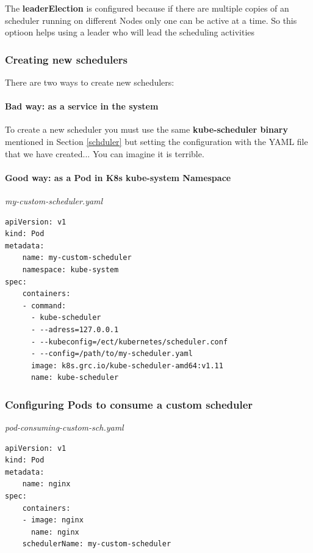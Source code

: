 \documentclass{article}
\newenvironment{codetemplate}[1][]{%
  \mybasecolorbox[#1]
  \itshape
}{%
  \endmybasecolorbox
}
\begin{document}
The \textbf{leaderElection} is configured because if there are multiple copies of an scheduler running on different Nodes only one can be active at a time. So this optioon helps using a leader who will lead the scheduling activities

\subsubsection{Creating new schedulers}

There are two ways to create new schedulers:

\paragraph{Bad way: as a service in the system}

To create a new scheduler you must use the same \textbf{kube-scheduler binary} mentioned in Section \ref{schduler} but setting the configuration with the YAML file that we have created... You can imagine it is terrible.

\paragraph{Good way: as a Pod in K8s kube-system Namespace}

\begin{codetemplate}{my-custom-scheduler.yaml}
\begin{verbatim}
apiVersion: v1
kind: Pod
metadata:
    name: my-custom-scheduler
    namespace: kube-system
spec:
    containers:
    - command:
      - kube-scheduler
      - --adress=127.0.0.1
      - --kubeconfig=/ect/kubernetes/scheduler.conf
      - --config=/path/to/my-scheduler.yaml
      image: k8s.grc.io/kube-scheduler-amd64:v1.11
      name: kube-scheduler
\end{verbatim}
\end{codetemplate}

\subsubsection{Configuring Pods to consume a custom scheduler}

\begin{codetemplate}{pod-consuming-custom-sch.yaml}
\begin{verbatim}
apiVersion: v1
kind: Pod
metadata:
    name: nginx
spec:
    containers:
    - image: nginx
      name: nginx
    schedulerName: my-custom-scheduler
\end{verbatim}
\end{codetemplate}
\end{document}
